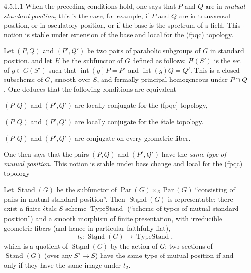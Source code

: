 \begin{definition}{4.5.1.1}\label{XXVI.4.5.1.1}
 When the preceding conditions hold, one says that $P$ and $Q$ are in \emph{mutual standard position}; this is the case, for example, if $P$ and $Q$ are in transversal position, or in osculatory position, or if the base is the spectrum of a field. This notion is stable under extension of the base and local for the (fpqc) topology.
\end{definition}

\label{XXVI.4.5.2}
Let $(P,Q)$ and $(P',Q')$ be two pairs of parabolic subgroups of $G$ in standard position, and let $\underline H$ be the subfunctor of $G$ defined as follows: $\underline H(S')$ is the set of $g\in G(S')$ such that $\operatorname{int}(g)P=P'$ and $\operatorname{int}(g)Q=Q'$. This is a closed subscheme of $G$, smooth over $S$, and formally principal homogeneous under $P\cap Q$. One deduces that the following conditions are equivalent:
\begin{enumeratei}
\item $(P,Q)$ and $(P',Q')$ are locally conjugate for the (fpqc) topology,
\item $(P,Q)$ and $(P',Q')$ are locally conjugate for the \'etale topology.
\item $(P,Q)$ and $(P',Q')$ are conjugate on every geometric fiber.
\end{enumeratei}
One then says that the pairs $(P,Q)$ and $(P',Q')$ have the \emph{same type of mutual position}. This notion is stable under base change and local for the (fpqc) topology.

\label{XXVI.4.5.3}
Let $\underline{\operatorname{Stand}}(G)$ be the subfunctor of $\underline{\operatorname{Par}}(G)\times_S\underline{\operatorname{Par}}(G)$ ``consisting of pairs in mutual standard position''. Then $\underline{\operatorname{Stand}}(G)$ is representable; there exist a finite \'etale $S$-scheme $\underline{\operatorname{TypeStand}}$ (``scheme of types of mutual standard position'') and a smooth morphism of finite presentation, with irreducible geometric fibers (and hence in particular faithfully flat),
\[
t_2:\underline{\operatorname{Stand}}(G)\to\underline{\operatorname{TypeStand}},
\]
which is a quotient of $\underline{\operatorname{Stand}}(G)$ by the action of $G$: two sections of $\underline{\operatorname{Stand}}(G)$ (over any $S'\to S$) have the same type of mutual position if and only if they have the same image under $t_2$.

